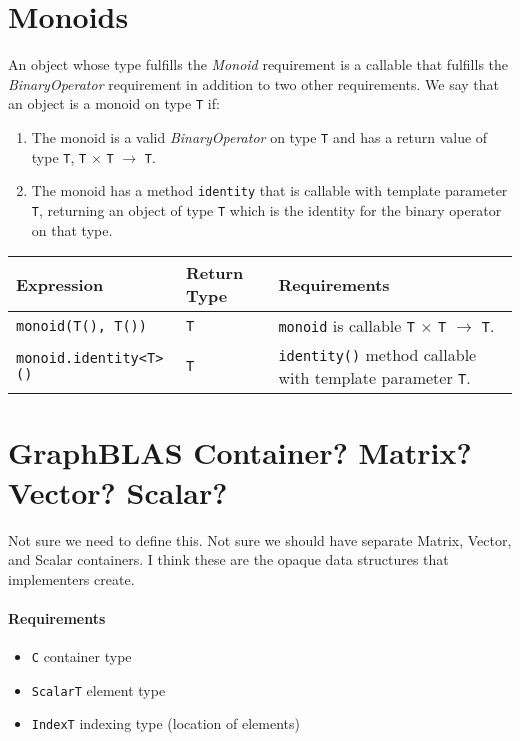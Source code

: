 \section{Monoids}
An object whose type fulfills the \textit{Monoid} requirement is a callable that
fulfills the \textit{BinaryOperator} requirement in addition to two other requirements.
We say that an object is a monoid on type \texttt{T} if:

\begin{enumerate}
   \item The monoid is a valid \textit{BinaryOperator} on type \texttt{T} and has a return value of type \texttt{T}, \texttt{T} $\times$ \texttt{T} $\rightarrow$ \texttt{T}.
   \item The monoid has a method \texttt{identity} that is callable with template parameter \texttt{T}, returning an object of type \texttt{T} which is the identity for the binary operator on that type.
\end{enumerate}

\begin{tabularx}{\textwidth}{l l X}
\textbf{Expression} & \textbf{Return Type} & \textbf{Requirements}\\
\hline
\texttt{monoid(T(), T())} & \texttt{T} & \texttt{monoid} is callable \texttt{T} $\times$ \texttt{T} $\rightarrow$ \texttt{T}.\\
\hline
\texttt{monoid.identity<T>()} & \texttt{T} & \texttt{identity()} method callable with template parameter \texttt{T}.\\
\end{tabularx}

\section{GraphBLAS Container? Matrix? Vector? Scalar?}

Not sure we need to define this.  Not sure we should have separate Matrix, Vector, 
and Scalar containers. I think these are the opaque data structures that implementers create.


\paragraph{Requirements}
\begin{itemize} \itemsep0em
\item \texttt{C} container type
\item \texttt{ScalarT} element type
\item \texttt{IndexT} indexing type (location of elements)
\end{itemize}

